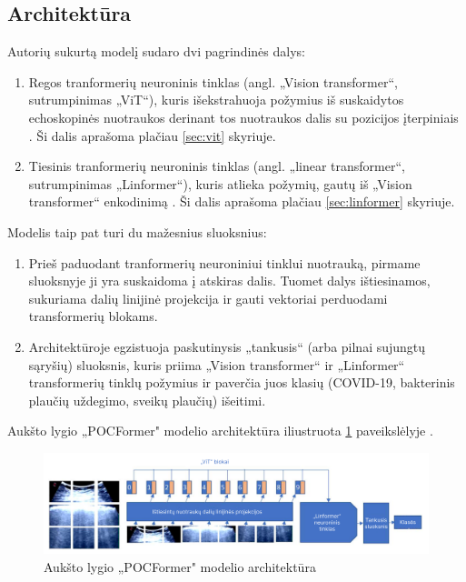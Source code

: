 \documentclass[fleqn]{VUMIFKompMagistrinis}
\begin{document}
\subsection{Architektūra}

Autorių sukurtą modelį sudaro dvi pagrindinės dalys: 
\begin{enumerate}
    \item Regos tranformerių neuroninis tinklas (angl. „Vision transformer“, sutrumpinimas „ViT“), kuris išekstrahuoja požymius iš suskaidytos echoskopinės nuotraukos derinant tos nuotraukos dalis su pozicijos įterpiniais \cite{PAY21}. Ši dalis aprašoma plačiau \ref{sec:vit} skyriuje.
    \item Tiesinis tranformerių neuroninis tinklas (angl. „linear transformer“, sutrumpinimas „Linformer“), kuris atlieka požymių, gautų iš „Vision transformer“ enkodinimą \cite{PAY21}. Ši dalis aprašoma plačiau \ref{sec:linformer} skyriuje.
\end{enumerate}
\par
Modelis taip pat turi du mažesnius sluoksnius:
\begin{enumerate}
    \item Prieš paduodant tranformerių neuroniniui tinklui nuotrauką, pirmame sluoksnyje ji yra suskaidoma į atskiras dalis. Tuomet dalys ištiesinamos, sukuriama dalių linijinė projekcija ir gauti vektoriai perduodami transformerių blokams. \cite{PAY21}
    \item Architektūroje egzistuoja paskutinysis „tankusis“ (arba pilnai sujungtų sąryšių) sluoksnis, kuris priima „Vision transformer“ ir „Linformer“ transformerių tinklų požymius ir paverčia juos klasių (COVID-19, bakterinis plaučių uždegimo, sveikų plaučių) išeitimi. \cite{PAY21}
\end{enumerate}
Aukšto lygio „POCFormer" modelio architektūra iliustruota \ref{img:POCFormer} paveikslėlyje .
\begin{figure}[H]
    \centering
    \includegraphics[scale=0.45]{img/transformerisMain.png}
    \caption{Aukšto lygio „POCFormer" modelio architektūra \cite{PAY21}}
    \label{img:POCFormer}
\end{figure}
\end{document}
